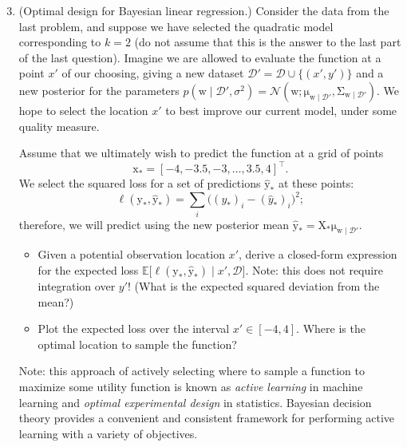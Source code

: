 \documentclass{article}
\newcommand{\given}{\mid}
\newcommand{\mc}[1]{\mathcal{#1}}
\newcommand{\data}{\mc{D}}
\newcommand{\mat}[1]{\bm{\mathrm{#1}}}
\renewcommand{\vec}[1]{\bm{\mathrm{#1}}}
\newcommand{\trans}{^\top}
\begin{document}
\clearpage
\begin{enumerate}
\setcounter{enumi}{2}
\item
  (Optimal design for Bayesian linear regression.)
  Consider the data from the last problem, and suppose we have
  selected the quadratic model corresponding to $k = 2$ (do not assume
  that this is the answer to the last part of the last question).
  Imagine we are allowed to evaluate the function at a point $x'$ of
  our choosing, giving a new dataset $\data' = \data \cup \bigl\{ (x',
  y') \bigr\}$ and a new posterior for the parameters $p(\vec{w}
  \given \data', \sigma^2) = \mc{N}(\vec{w};
  \vec{\mu}_{\vec{w}\given\data'},
  \mat{\Sigma}_{\vec{w}\given\data'})$.  We hope to select the
  location $x'$ to best improve our current model, under some quality
  measure.

  Assume that we ultimately wish to predict the function at a grid of
  points
  \begin{equation*}
    \vec{x}_\ast = [-4, -3.5, -3, \dotsc, 3.5, 4]\trans.
  \end{equation*}
  We select the squared loss for a set of predictions
  $\hat{\vec{y}}_\ast$ at these points:
  \begin{equation*}
    \ell(\vec{y}_\ast, \hat{\vec{y}}_\ast)
    =
    \sum_i \bigl((y_\ast)_i - (\hat{y}_\ast)_i\bigr)^2;
  \end{equation*}
  therefore, we will predict using the new posterior mean
  $\hat{\vec{y}}_\ast = \mat{X}_\ast \vec{\mu}_{\vec{w}\given\data'}$.
  \begin{itemize}
  \item
    Given a potential observation location $x'$, derive a closed-form
    expression for the expected loss
    $\mathbb{E}\bigl[\ell(\vec{y}_\ast, \hat{\vec{y}}_\ast) \given x',
      \data \bigr]$.  Note: this does not require integration over
    $y'$!  (What is the expected squared deviation from the mean?)
  \item
    Plot the expected loss over the interval $x' \in [-4, 4]$.  Where
    is the optimal location to sample the function?
  \end{itemize}

  Note: this approach of actively selecting where to sample a function
  to maximize some utility function is known as \emph{active learning}
  in machine learning and \emph{optimal experimental design} in
  statistics.  Bayesian decision theory provides a convenient and
  consistent framework for performing active learning with a variety
  of objectives.
\end{enumerate}
\end{document}
